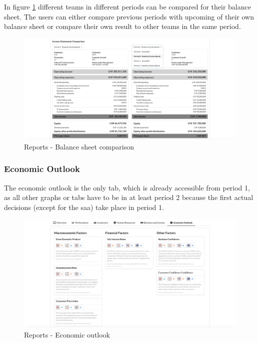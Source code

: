 In figure \ref{fig:reports_balance_sheet_comparison} different teams in different periods can be compared for their balance sheet. The users can either compare previous periods with upcoming of their own balance sheet or compare their own result to other teams in the same period.
\begin{figure}[h!]
  \centering
  \includegraphics[scale=0.2]{img/application-overview/reports/05_business_income_balance_sheet_comparison.png}
  \caption{Reports - Balance sheet comparison}
  \label{fig:reports_balance_sheet_comparison}
\end{figure}


\subsubsection{Economic Outlook}
The economic outlook is the only tab, which is already accessible from period 1, as all other graphs or tabs have to be in at least period 2 because the first actual decisions (except for the saa) take place in period 1.
\begin{figure}[h!]
  \centering
  \includegraphics[scale=0.2]{img/application-overview/reports/06_economic_outlook.png}
  \caption{Reports - Economic outlook}
\end{figure}
